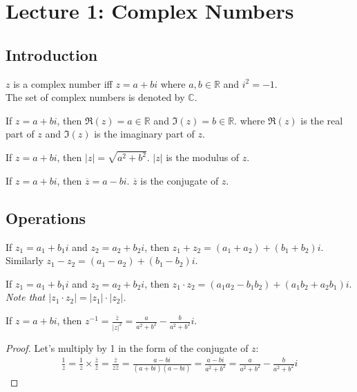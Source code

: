 \chapter{Lecture 1: Complex Numbers}
\section{Introduction}
\begin{definition}
    $z$ is a complex number iff $z = a + bi$ where $a, b \in \mathbb{R}$ and $i^2 = -1$. \\
    The set of complex numbers is denoted by $\mathbb{C}$.
\end{definition}
\begin{definition}
    If $z = a + bi$, then $\Re(z) = a \in \mathbb{R}$ and $\Im(z) = b \in \mathbb{R}$. where $\Re(z)$ is the real part of $z$ and $\Im(z)$ is the imaginary part of $z$.
\end{definition}

\begin{definition}
    [Modulus]
    If $z = a + bi$, then $|z| = \sqrt{a^2 + b^2}$. $|z|$ is the modulus of $z$.
\end{definition}

\begin{definition}
    [Conjugate]
    If $z = a + bi$, then $\overline{z} = a - bi$. $\overline{z}$ is the conjugate of $z$.
\end{definition}
\section{Operations}
\begin{definition}
    If $z_1 = a_1 + b_1i$ and $z_2 = a_2 + b_2i$, then $z_1 + z_2 = (a_1 + a_2) + (b_1 + b_2)i$. \\
    Similarly $z_1 - z_2 = (a_1 - a_2) + (b_1 - b_2)i$.
\end{definition}

\begin{definition}
    [Multiplication]
    If $z_1 = a_1 + b_1i$ and $z_2 = a_2 + b_2i$, then $z_1 \cdot z_2 = (a_1a_2 - b_1b_2) + (a_1b_2 + a_2b_1)i$. \\
    \textit{    Note that $|z_1 \cdot z_2| = |z_1| \cdot |z_2|$.}
\end{definition}

\begin{definition}
    [Inversion]
    If $z = a + bi$, then $z^{-1} = \frac{\overline{z}}{|z|^2}= \frac{a}{a^2 + b^2} - \frac{b}{a^2 + b^2}i$.
\end{definition}
\begin{proof}
    Let's multiply by 1 in the form of the conjugate of $z$:
    \begin{align*}
        \frac{1}{z} = \frac{1}{z}\times \frac{\overline{z}}{\overline{z}} = \frac{\overline{z}}{z\overline{z}} = \frac{a - bi}{(a + bi)(a - bi)} = \frac{a - bi}{a^2 + b^2} = \frac{a}{a^2 + b^2} - \frac{b}{a^2 + b^2}i
    \end{align*}
\end{proof}

